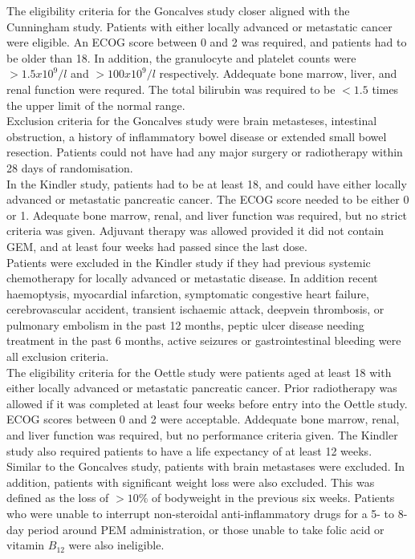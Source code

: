 The eligibility criteria for the Goncalves study closer aligned with the Cunningham study. Patients with either locally advanced or metastatic cancer were eligible. An ECOG score between 0 and 2 was required, and patients had to be older than 18. In addition, the granulocyte and platelet counts were $>1.5x10^9/l$ and $>100x10^9/l$ respectively. Addequate bone marrow, liver, and renal function were requred. The total bilirubin was required to be $< 1.5$ times the upper limit of the normal range. \\

Exclusion criteria for the Goncalves study were brain metasteses, intestinal obstruction, a history of inflammatory bowel disease or extended small bowel resection. Patients could not have had any major surgery or radiotherapy within 28 days of randomisation. \\

In the Kindler study, patients had to be at least 18, and could have either locally advanced or metastatic pancreatic cancer. The ECOG score needed to be either 0 or 1. Adequate bone marrow, renal, and liver function was required, but no strict criteria was given. Adjuvant therapy was allowed provided it did not contain GEM, and at least four weeks had passed since the last dose. \\

Patients were excluded in the Kindler study if they had previous systemic chemotherapy for locally advanced or metastatic disease. In addition recent haemoptysis, myocardial infarction, symptomatic congestive heart failure, cerebrovascular accident, transient ischaemic attack, deepvein thrombosis, or pulmonary embolism in the past 12 months, peptic ulcer disease needing treatment in the past 6 months, active seizures or gastrointestinal bleeding were all exclusion criteria. \\

The eligibility criteria for the Oettle study were patients aged at least 18 with either locally advanced or metastatic pancreatic cancer. Prior radiotherapy was allowed if it was completed at least four weeks before entry into the Oettle study. ECOG scores between 0 and 2 were acceptable. Addequate bone marrow, renal, and liver function was required, but no performance criteria given. The Kindler study also required patients to have a life expectancy of at least 12 weeks. \\

Similar to the Goncalves study, patients with brain metastases were excluded. In addition, patients with significant weight loss were also excluded. This was defined as the loss of $>10\%$ of bodyweight in the previous six weeks. Patients who were unable to interrupt non-steroidal anti-inflammatory drugs for a 5- to 8-day period around PEM administration, or those unable to take folic acid or vitamin $B_{12}$ were also ineligible. \\

